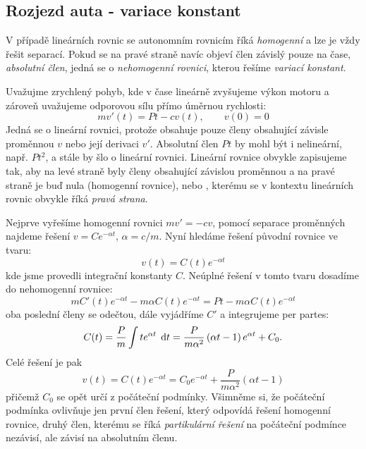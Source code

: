 \documentclass[a4paper, 12pt]{book}
\theoremstyle{definition}
\def\d{\,{\rm d}}               %
\def\df#1{\emph{#1}}
\begin{document}
\subsection{Rozjezd auta - variace konstant}
V případě lineárních rovnic se autonomním rovnicím říká \df{homogenní} a lze je vždy řešit separací. Pokud se na pravé straně navíc objeví člen
závislý pouze na čase, \df{absolutní člen}, jedná se o \df{nehomogenní rovnici}, kterou řešíme \df{variací konstant}.

Uvažujme zrychlený pohyb, kde v čase lineárně zvyšujeme výkon motoru a zároveň uvažujeme odporovou sílu přímo úměrnou rychlosti:
\[
  mv'(t) = Pt - c v(t), \qquad v(0)=0
\]
Jedná se o lineární rovnici, protože obsahuje pouze členy obsahující závisle proměnnou $v$ nebo její derivaci $v'$. Absolutní člen $Pt$ by mohl být i nelineární,
např. $Pt^2$, a stále by šlo o lineární rovnici. Lineární rovnice obvykle zapisujeme tak, aby na levé straně byly členy obsahující závislou proměnnou a na pravé straně je buď nula (homogenní rovnice),
nebo , kterému se v kontextu lineárních rovnic obvykle říká \df{pravá strana}.

Nejprve vyřešíme homogenní rovnici $mv'= - cv$, pomocí separace proměnných najdeme řešení $ v=Ce^{-\alpha t}$, $\alpha = c/m$. Nyní hledáme řešení původní rovnice ve tvaru:
\[
   v(t) = C(t) e^{-\alpha t}
\]
kde jsme provedli  integrační konstanty $C$. Neúplné řešení v tomto tvaru do\-sa\-dí\-me do nehomogenní rovnice:
\[
  m C'(t) e^{-\alpha t} - m \alpha C(t) e^{-\alpha t} = Pt - m \alpha C(t) e^{-\alpha t}
\]
oba poslední členy se odečtou, dále vyjádříme $C'$ a integrujeme per partes:
\[
  C(t) = \frac{P}{m} \int te^{\alpha t} \; \d t = \frac{P}{m\alpha^2}\left(\alpha t - 1\right)e^{\alpha t} + C_0.
\]
Celé řešení je pak
\[
  v(t) = C(t) e^{-\alpha t} = C_0 e^{-\alpha t} + \frac{P}{m\alpha^2} (\alpha t - 1)
\]
přičemž $C_0$ se opět určí z počáteční podmínky. Všimněme si, že počáteční podmínka ovlivňuje jen první člen řešení, který odpovídá řešení 
homogenní rovnice, druhý člen, kterému se říká \df{partikulární řešení} na počáteční podmínce nezávisí, ale závisí na absolutním členu. 
\end{document}
